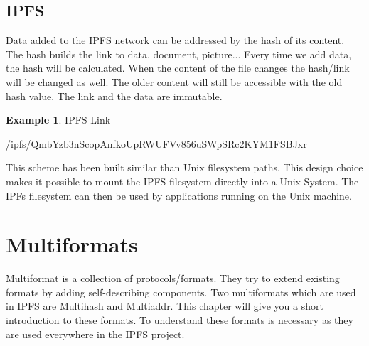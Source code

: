 \documentclass[a4paper,11pt, oneside]{report}
\theoremstyle{definition}
\newtheorem{exmp}{Example}[subsection]
\begin{document}
\subsection{IPFS}
Data added to the IPFS network can be addressed by the hash of its content. The hash builds the link to data, document, picture... Every time we add data, the hash will be calculated. When the content of the file changes the hash/link will be changed as well.  The older content will still be accessible with the old hash value. The link and the data are immutable.
\begin{exmp} IPFS Link
\begin{center}
	/ipfs/QmbYzb3nScopAnfkoUpRWUFVv856uSWpSRc2KYM1FSBJxr
\end{center}
This scheme has been built similar than Unix filesystem paths. This design choice makes it possible to mount the IPFS filesystem directly into a Unix System. The IPFs filesystem can then be used by applications running on the Unix machine.
\end{exmp}


\section{Multiformats}
Multiformat is a collection of protocols/formats. They try to extend existing formats by adding self-describing components.  Two multiformats which are used in IPFS are Multihash and Multiaddr. This chapter will give you a short introduction to these formats. To understand these formats is necessary as they are used everywhere in the IPFS project.
\end{document}
